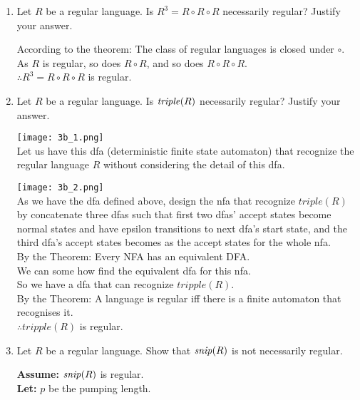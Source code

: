 \documentclass[11pt]{article}
\newcommand{\id}[1]{\mbox{\textit{#1}}}
\begin{document}
\begin{enumerate}
\item
Let $R$ be a regular language.
Is $R^3 = R \circ R \circ R$ necessarily regular? 
Justify your answer.

According to the theorem: The class of regular languages is closed under $\circ$. \\
As $R$ is regular, so does $R \circ R$, and so does $R \circ R \circ R$. \\
$\therefore R^3 = R \circ R \circ R$ is regular.

\item
Let $R$ be a regular language.
Is $\id{triple}(R)$ necessarily regular?  
Justify your answer.

\texttt{[image: 3b\_1.png]} \\

Let us have this dfa (deterministic finite state automaton) that recognize the regular language $R$ without considering the detail of this dfa.

\texttt{[image: 3b\_2.png]} \\

As we have the dfa defined above, design the nfa that recognize $triple(R)$ by concatenate three dfas such that first two dfas' accept states become normal states and have epsilon transitions to next dfa's start state, and the third dfa's accept states becomes as the accept states for the whole nfa. \\
By the Theorem: Every NFA has an equivalent DFA. \\
We can some how find the equivalent dfa for this nfa. \\
So we have a dfa that can recognize $tripple(R)$. \\
By the Theorem: A language is regular iff there is a finite automaton that recognises it. \\
$\therefore tripple(R)$ is regular. 

\item
Let $R$ be a regular language.
Show that $\id{snip}(R)$ is not necessarily regular.

\textbf{Assume:} $\id{snip}(R)$ is regular. \\
\textbf{Let:} $p$ be the pumping length. 



\end{enumerate}
\end{document}
